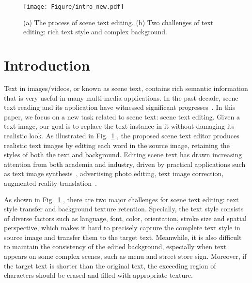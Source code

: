 \documentclass[sigconf]{acmart}
\begin{document}

\begin{comment}
\begin{teaserfigure}
  \texttt{[image: sampleteaser]}
  \caption{Seattle Mariners at Spring Training, 2010.}
  \Description{Enjoying the baseball game from the third-base seats. Ichiro Suzuki preparing to bat.}
  \label{fig:teaser}
\end{teaserfigure}
\end{comment}



\maketitle
\begin{figure}
\centering
\texttt{[image: Figure/intro\_new.pdf]}
\caption{(a) The process of scene text editing. (b) Two challenges of text editing: rich text style and complex background.}
\label{fig:intro}
\vspace{-0.4cm}
\end{figure}
\section{Introduction}
\label{sec:intro}
Text in images/videos, or known as scene text, contains rich semantic information that is very useful in many multi-media applications. In the past decade, scene text reading and its application have witnessed significant progresses~\cite{long2018scene,shi2017end,zhang2016multi,fang2018attention,zhang2019look}. In this paper, we focus on a new task related to scene text: scene text editing. Given a text image, our goal is to replace the text instance in it without damaging its realistic look. As illustrated in Fig.~\ref{fig:intro} , the proposed scene text editor produces realistic text images by editing each word in the source image, retaining the styles of both the text and background. Editing scene text has drawn increasing attention from both academia and industry, driven by practical applications such as text image synthesis~\cite{yang2018context}, advertising photo editing, text image correction, augmented reality translation~\cite{fragoso2011translatar}.

As shown in Fig.~\ref{fig:intro} , there are two major challenges for scene text editing: text style transfer and background texture retention. Specially, the text style consists of diverse factors 
such as 
language, font, color, orientation, stroke size and spatial perspective, which makes it hard to precisely capture the complete text style in source image and transfer them to the target text. Meanwhile, it is also difficult to maintain the consistency of the edited background, especially when text appears on some complex scenes, such as menu and street store sign. Moreover, if the target text is shorter than the original text, the exceeding region of characters should be erased and filled with appropriate texture. 
\end{document}

